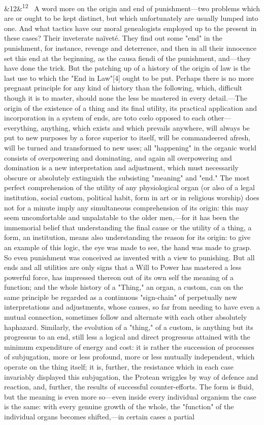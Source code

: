 \documentclass[12pt]{article}
\newcommand{\para}[1][]{\par\noindent\ifx&#1&\else\textsuperscript{\footnotesize #1}~\fi}
\begin{document}
\para[12] A word more on the origin and end of punishment---two problems which are or ought to be kept distinct, but which unfortunately are usually lumped into one. And what tactics have our moral genealogists employed up to the present in these cases? Their inveterate naïveté. They find out some "end" in the punishment, for instance, revenge and deterrence, and then in all their innocence set this end at the beginning, as the causa fiendi of the punishment, and---they have done the trick. But the patching up of a history of the origin of law is the last use to which the "End in Law"[4] ought to be put. Perhaps there is no more pregnant principle for any kind of history than the following, which, difficult though it is to master, should none the less be mastered in every detail.---The origin of the existence of a thing and its final utility, its practical application and incorporation in a system of ends, are toto cœlo opposed to each other---everything, anything, which exists and which prevails anywhere, will always be put to new purposes by a force superior to itself, will be commandeered afresh, will be turned and transformed to new uses; all "happening" in the organic world consists of overpowering and dominating, and again all overpowering and domination is a new interpretation and adjustment, which must necessarily obscure or absolutely extinguish the subsisting "meaning" and "end." The most perfect comprehension of the utility of any physiological organ (or also of a legal institution, social custom, political habit, form in art or in religious worship) does not for a minute imply any simultaneous comprehension of its origin: this may seem uncomfortable and unpalatable to the older men,---for it has been the immemorial belief that understanding the final cause or the utility of a thing, a form, an institution, means also understanding the reason for its origin: to give an example of this logic, the eye was made to see, the hand was made to grasp. So even punishment was conceived as invented with a view to punishing. But all ends and all utilities are only signs that a Will to Power has mastered a less powerful force, has impressed thereon out of its own self the meaning of a function; and the whole history of a "Thing," an organ, a custom, can on the same principle be regarded as a continuous "sign-chain" of perpetually new interpretations and adjustments, whose causes, so far from needing to have even a mutual connection, sometimes follow and alternate with each other absolutely haphazard. Similarly, the evolution of a "thing," of a custom, is anything but its progressus to an end, still less a logical and direct progressus attained with the minimum expenditure of energy and cost: it is rather the succession of processes of subjugation, more or less profound, more or less mutually independent, which operate on the thing itself; it is, further, the resistance which in each case invariably displayed this subjugation, the Protean wriggles by way of defence and reaction, and, further, the results of successful counter-efforts. The form is fluid, but the meaning is even more so---even inside every individual organism the case is the same: with every genuine growth of the whole, the "function" of the individual organs becomes shifted,---in certain cases a partial 
\end{document}
